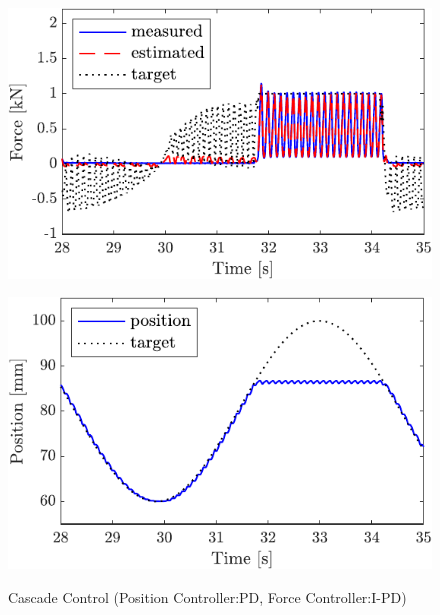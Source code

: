 \begin{figure}[t]
    \begin{minipage}{\minipageratio\hsize}
    \centering
        \includegraphics[keepaspectratio, scale = \minifigscale]{contents/IntegrationControl/figure/SECASQ/crop-FBcsqtch_IPD_Notrq_posPIDadjust_force.pdf}
        \label{fig5:crop-FBcsqtch_IPD_Notrq_posPIDadjust_force}
    \end{minipage}
    \begin{minipage}{\minipageratio\hsize}
    \centering
        \includegraphics[keepaspectratio, scale = \minifigscale]{contents/IntegrationControl/figure/SECASQ/crop-FBcsqtch_IPD_Notrq_posPIDadjust_pos.pdf}
        \label{fig5:crop-FBcsqtch_IPD_Notrq_posPIDadjust_pos}
    \end{minipage}
    \caption{Cascade Control (Position Controller:PD, Force Controller:I-PD)}  
    \label{fig5:crop-FBcsqtch_IPD_Notrq_posPIDadjust}
\end{figure}

